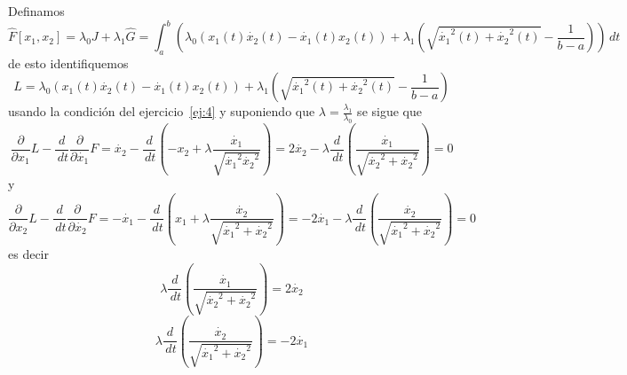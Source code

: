 \documentclass{ejercicios}
\begin{document}
\begin{solution}
  Definamos 
  \[
    \hat{F}[x_1,x_2] = \lambda_0J + \lambda_1\hat{G} = \int_{a}^{b}\left(\lambda_0\left(x_1(t)\dot{x_2}(t) - \dot{x_1}(t)x_2(t)\right) + \lambda_1\left(\sqrt{\dot{x_1}^2(t) + \dot{x_2}^2(t)} - \frac{1}{b-a}\right)\right)\,dt
  \]
  de esto identifiquemos 
  \[
    L = \lambda_0\left(x_1(t)\dot{x_2}(t) - \dot{x_1}(t)x_2(t)\right) + \lambda_1\left(\sqrt{\dot{x_1}^2(t) + \dot{x_2}^2(t)} - \frac{1}{b-a}\right)
  \]
  usando la condición del ejercicio~\ref{ej:4} y suponiendo que $\lambda = \frac{\lambda_1}{\lambda_0}$ se sigue que 
  \[
    \frac{\partial}{\partial x_1}L - \frac{d}{\,dt}\frac{\partial}{\partial\dot{x_1}}F = \dot{x_2} - \frac{d}{\,dt} \left(- x_2 + \lambda\frac{\dot{x_1}}{\sqrt{\dot{x_1}^2 \dot{x_2}^2}}\right) = 2\dot{x_2} - \lambda\frac{d}{\,dt}\left(\frac{\dot{x_1}}{\sqrt{\dot{x_2}^2 + \dot{x_2}^2}}\right) = 0
  \]
  y 
  \[
    \frac{\partial}{\partial x_2}L - \frac{d}{\,dt}\frac{\partial}{\partial\dot{x_2}}F = -\dot{x_1} - \frac{d}{\,dt}\left(x_1 + \lambda \frac{\dot{x_2}}{\sqrt{\dot{x_1}^2 + \dot{x_2}^2}}\right) = -2\dot{x_1} - \lambda\frac{d}{\,dt}\left(\frac{\dot{x_2}}{\sqrt{\dot{x_1}^2 + \dot{x_2}^2}}\right) = 0
  \]
  es decir 
  \begin{equation}\label{eq:8}
    \lambda\frac{d}{\,dt}\left(\frac{\dot{x_1}}{\sqrt{\dot{x_2}^2 + \dot{x_2}^2}}\right) = 2\dot{x_2}
  \end{equation}
\begin{equation}\label{eq:9}
  \lambda\frac{d}{\,dt}\left(\frac{\dot{x_2}}{\sqrt{\dot{x_1}^2 + \dot{x_2}^2}}\right) = -2\dot{x_1}
\end{equation}


\end{solution}
\end{document}
